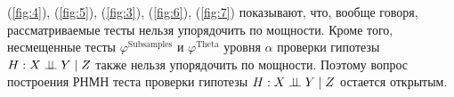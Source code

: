 (\autoref{fig:4}), (\autoref{fig:5}), 
(\autoref{fig:3}), (\autoref{fig:6}), (\autoref{fig:7})
показывают, что, вообще говоря, рассматриваемые тесты нельзя упорядочить по мощности.
Кроме того, несмещенные тесты $\varphi^{\text{Subsamples}}$
и $\varphi^{\text{Theta}}$ уровня $\alpha$ проверки
гипотезы $H: X \perp\!\!\!\perp Y \mid Z$ также нельзя упорядочить по мощности.
Поэтому вопрос построения РНМН теста проверки гипотезы 
$H: X \perp\!\!\!\perp Y \mid Z$ остается открытым. 






